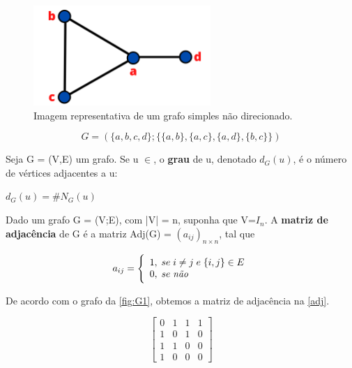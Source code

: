 \begin{figure}[htb]
	\caption{\label{fig:G1} Imagem representativa de um grafo simples não direcionado.}
	\begin{center}
		\includegraphics[width=0.6\textwidth]{images/grafo.png}
	\end{center}
\end{figure}

\begin{equation}
    G = (\{a,b,c,d\}; \{\{a,b\},\{a,c\},\{a,d\}, \{b,c\}\})
\end{equation}

\begin{definition}
Seja G = (V,E) um grafo. Se u $\in$, o \textbf{grau} de u, denotado $d_G(u)$, é o número de vértices adjacentes a u: 
\begin{center}
$d_G(u) = \#N_G(u)$
\end{center}
\end{definition}

\begin{definition}
Dado um grafo G = (V;E), com |V| = n, suponha que V=$I_n$. A \textbf{matriz de adjacência} de G é a matriz Adj(G) = $(a_{ij})_{n\times n}$, tal que
\begin{center}
\begin{equation*}
a_{ij}= \Bigg{\{} \begin{array}{ll} 1, \; se \; i\neq j  \; e \; \{i,j\} \in E \\ 0, \; se \; \textit{não} \end{array}
\end{equation*}
\end{center}
\end{definition}

De acordo com o grafo da \autoref{fig:G1}, obtemos a matriz de adjacência na \autoref{adj}.

\begin{equation}
\label{adj}
    \begin{bmatrix}
       0 & 1 & 1 & 1 \\
       1 & 0 & 1 & 0 \\
       1 & 1 & 0 & 0 \\
       1 & 0 & 0 & 0 
    \end{bmatrix}
\end{equation}